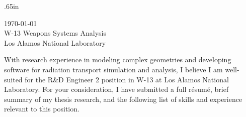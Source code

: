 
\begin{center}
\begin{minipage}{\textwidth}

  \normalsize

	\vspace{1mm}
  
  \begingroup
  \leftskip.65in
  \rightskip\leftskip

\today \\
W-13 Weapons Systems Analysis\\
Los Alamos National Laboratory \\
  
  \vspace{2mm} 

With research experience in modeling complex geometries and developing
software for radiation transport simulation and analysis, I believe I am
well-suited for the R\&D Engineer 2  position in W-13
at Los Alamos National Laboratory.
For your consideration, I have submitted a full r\'{e}sum\'{e}, brief summary of my thesis research, and
the following list of skills and
experience relevant to this position. \\



\end{minipage}
\end{center}
